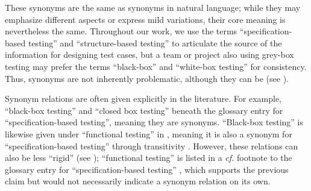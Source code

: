 These synonyms are the same as synonyms in natural language; while they may
emphasize different aspects or express mild variations, their core meaning
is nevertheless the same. Throughout our work, we use the terms
``specification-based testing'' and ``structure-based testing'' to articulate
the source of the information for designing test cases, but a team or project
also using grey-box testing may prefer the terms ``black-box'' and ``white-box
testing'' for consistency. Thus, synonyms are not inherently problematic,
although they can be (see ).

Synonym relations are often given explicitly in the literature. For example,
\citet[p.~9]{IEEE2022}  ``black-box testing'' and
``closed box testing'' beneath the glossary entry for ``specification-based
testing'', meaning they are synonyms. ``Black-box testing'' is likewise given
under ``functional testing'' in \citeyearpar[p.~196]{IEEE2017}, meaning it is
also a synonym for ``specification-based testing'' through transitivity%
.
However, these relations can also be less ``rigid'' (see );
``functional testing'' is listed in a \emph{cf.} footnote to the glossary entry
for ``specification-based testing'' \citeyearpar[p.~431]{IEEE2017}, which
supports the previous claim but would not necessarily indicate a synonym
relation on its own.

